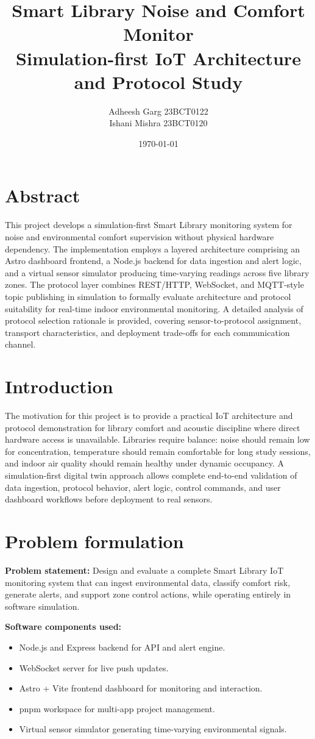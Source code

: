 \documentclass[12pt,a4paper]{article}
\title{Smart Library Noise and Comfort Monitor\\Simulation-first IoT Architecture and Protocol Study}
\author{Adheesh Garg 23BCT0122\\Ishani Mishra 23BCT0120}
\date{\today}
\begin{document}
\maketitle

\section*{Abstract}
This project develops a simulation-first Smart Library monitoring system for noise and environmental comfort supervision without physical hardware dependency. The implementation employs a layered architecture comprising an Astro dashboard frontend, a Node.js backend for data ingestion and alert logic, and a virtual sensor simulator producing time-varying readings across five library zones. The protocol layer combines REST/HTTP, WebSocket, and MQTT-style topic publishing in simulation to formally evaluate architecture and protocol suitability for real-time indoor environmental monitoring. A detailed analysis of protocol selection rationale is provided, covering sensor-to-protocol assignment, transport characteristics, and deployment trade-offs for each communication channel.

\section*{Introduction}
The motivation for this project is to provide a practical IoT architecture and protocol demonstration for library comfort and acoustic discipline where direct hardware access is unavailable. Libraries require balance: noise should remain low for concentration, temperature should remain comfortable for long study sessions, and indoor air quality should remain healthy under dynamic occupancy. A simulation-first digital twin approach allows complete end-to-end validation of data ingestion, protocol behavior, alert logic, control commands, and user dashboard workflows before deployment to real sensors.

\section*{Problem formulation}
\textbf{Problem statement:} Design and evaluate a complete Smart Library IoT monitoring system that can ingest environmental data, classify comfort risk, generate alerts, and support zone control actions, while operating entirely in software simulation.

\textbf{Software components used:}
\begin{itemize}[leftmargin=1.5em]
	\item Node.js and Express backend for API and alert engine.
	\item WebSocket server for live push updates.
	\item Astro + Vite frontend dashboard for monitoring and interaction.
	\item pnpm workspace for multi-app project management.
	\item Virtual sensor simulator generating time-varying environmental signals.
\end{itemize}
\end{document}
